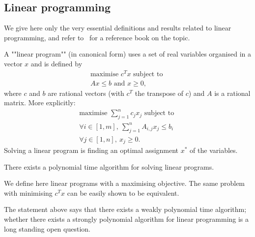 \subsection*{Linear programming}
We give here only the very essential definitions and results related to linear programming,
and refer to~\cite{Bertsimas&Tsitsiklis:1997} for a reference book on the topic.

A ""linear program"" (in canonical form) uses a set of real variables organised in a vector $x$ and is defined by
\[
\begin{array}{l}
\text{maximise } c^T x \text{ subject to } \\
A x \le b \text{ and } x \ge 0,
\end{array}
\]
where $c$ and $b$ are rational vectors (with $c^T$ the transpose of $c$) and $A$ is a rational matrix. 
More explicitly: 
\[
\begin{array}{l}
\text{maximise } \sum_{j = 1}^n c_j x_j \text{ subject to } \\
\forall i \in [1,m],\ \sum_{j = 1}^n A_{i,j} x_j \le b_i \\
\forall j \in [1,n],\ x_j \ge 0.
\end{array}
\]
Solving a linear program is finding an optimal assignment $x^*$ of the variables.

\begin{theorem}
\label{1-thm:linear_programming}
There exists a polynomial time algorithm for solving linear programs.
\end{theorem}
We define here linear programs with a maximising objective. 
The same problem with minimising $c^T x$ can be easily shown to be equivalent.

The statement above says that there exists a weakly polynomial time algorithm; whether there exists a strongly polynomial algorithm for linear programming is a long standing open question.

